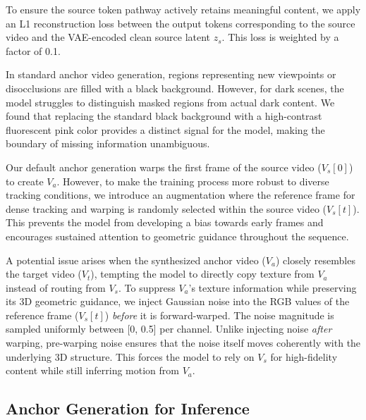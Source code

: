 \begin{description}[noitemsep, topsep=0pt, partopsep=0pt, leftmargin=0pt, style=unboxed, font=\normalfont\bfseries]
    \item[Auxiliary Loss] To ensure the source token pathway actively retains meaningful content, we apply an L1 reconstruction loss between the output tokens corresponding to the source video and the VAE-encoded clean source latent $z_s$. This loss is weighted by a factor of 0.1.
    
    \item[Fluorescent Background Anchor] In standard anchor video generation, regions representing new viewpoints or disocclusions are filled with a black background. However, for dark scenes, the model struggles to distinguish masked regions from actual dark content. We found that replacing the standard black background with a high-contrast fluorescent pink color provides a distinct signal for the model, making the boundary of missing information unambiguous.

    \item[Random Query] Our default anchor generation warps the first frame of the source video ($V_s[0]$) to create $V_a$. However, to make the training process more robust to diverse tracking conditions, we introduce an augmentation where the reference frame for dense tracking and warping is randomly selected within the source video ($V_s[t]$). This prevents the model from developing a bias towards early frames and encourages sustained attention to geometric guidance throughout the sequence.

    \item[3D Noise in Anchor] A potential issue arises when the synthesized anchor video ($V_a$) closely resembles the target video ($V_t$), tempting the model to directly copy texture from $V_a$ instead of routing from $V_s$. To suppress $V_a$'s texture information while preserving its 3D geometric guidance, we inject Gaussian noise into the RGB values of the reference frame ($V_s[t]$) \textit{before} it is forward-warped. The noise magnitude is sampled uniformly between [0, 0.5] per channel. Unlike injecting noise \textit{after} warping, pre-warping noise ensures that the noise itself moves coherently with the underlying 3D structure. This forces the model to rely on $V_s$ for high-fidelity content while still inferring motion from $V_a$.
\end{description}


\subsection{Anchor Generation for Inference}
\label{sec:inference_anchor_gen}

